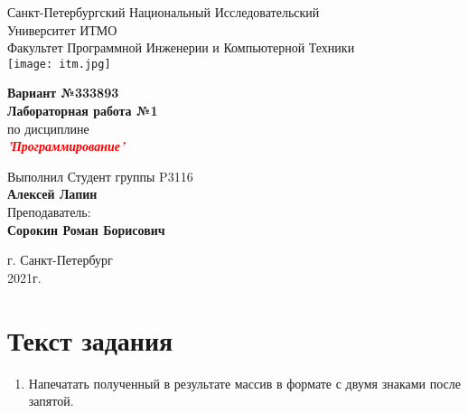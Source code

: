 \documentclass[12pt,onecolumn]{article}
\begin{document}
\begin{center}
    Санкт-Петербургский Национальный Исследовательский\\ 
    Университет ИТМО\\
    Факультет Программной Инженерии и Компьютерной Техники\\
    \texttt{[image: itm.jpg]} %
\end{center}
\vspace{1cm}


\begin{center}
    \large \textbf{Вариант №333893}\\
    \textbf{Лабораторная работа №1}\\
    по дисциплине\\
    \textbf{\textcolor{red}{\textit{'Программирование'}}}
\end{center}

\vspace{2cm}

\begin{flushright}
  Выполнил Студент  группы P3116\\
  \textbf{Алексей Лапин}\\
  Преподаватель: \\
  \textbf{Сорокин Роман Борисович}\\
\end{flushright}

\vspace{6cm}
\begin{center}
    г. Санкт-Петербург\\
    2021г.
\end{center}

\newpage
\section{Текст задания}
\begin{enumerate} 
 одномерный массив a типа short. Заполнить его чётными числами от 6 до 20 включительно в порядке возрастания.
 одномерный массив x типа float. Заполнить его 17-ю случайными числами в диапазоне от -3.0 до 15.0.
 двумерный массив a размером 8x17. Вычислить его элементы по следующей формуле (где x = x[j]):
\begin{itemize}  
\item если a[i] = 16, то a[i][j]=$e ^{(\frac{2}{3} + x \cdot (x-1))^3}$;
\item если $a[i] \in \{6, 12, 18, 20\}$, то $a[i][j]=\frac{1}{3}\cdot\ln((|x|+1)^x)$
\item для остальных значений a[i]: $a[i][j]=\frac{1}{2}/(3 - \arctan(\cos(x)))$.
\end{itemize}
\item Напечатать полученный в результате массив в формате с двумя знаками после запятой.
\end{enumerate}
\end{document}
